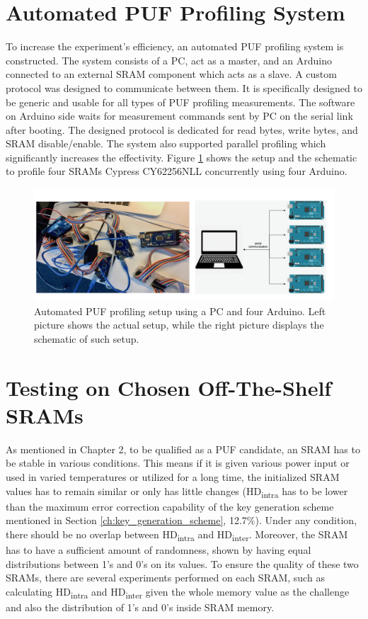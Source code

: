 \section{Automated PUF Profiling System}
To increase the experiment's efficiency, an automated PUF profiling system is constructed. The system consists of a PC, act as a master, and an Arduino connected to an external SRAM component which acts as a slave. A custom protocol was designed to communicate between them. It is specifically designed to be generic and usable for all types of PUF profiling measurements. The software on Arduino side waits for measurement commands sent by PC on the serial link after booting. The designed protocol is dedicated for read bytes, write bytes, and SRAM disable/enable. The system also supported parallel profiling which significantly increases the effectivity. Figure \ref{fig:puf_profiling} shows the setup and the schematic to profile four SRAMs Cypress CY62256NLL concurrently using four Arduino.

\begin{figure}[tph!]
    \centerline{\includegraphics[width={\textwidth}]{images/setup}}
    \caption{Automated PUF profiling setup using a PC and four Arduino. Left picture shows the actual setup, while the right picture displays the schematic of such setup.}
    \label{fig:puf_profiling}
\end{figure}

\section{Testing on Chosen Off-The-Shelf SRAMs}

As mentioned in Chapter 2, to be qualified as a PUF candidate, an SRAM has to be stable in various conditions. This means if it is given various power input or used in varied temperatures or utilized for a long time, the initialized SRAM values has to remain similar or only has little changes (HD\textsubscript{intra} has to be lower than the maximum error correction capability of the key generation scheme mentioned in Section \ref{ch:key_generation_scheme}, 12.7\%). Under any condition, there should be no overlap between HD\textsubscript{intra} and HD\textsubscript{inter}. Moreover, the SRAM has to have a sufficient amount of randomness, shown by having equal distributions between 1's and 0's on its values.  To ensure the quality of these two SRAMs, there are several experiments performed on each SRAM, such as calculating HD\textsubscript{intra} and HD\textsubscript{inter} given the whole memory value as the challenge and also the distribution of 1's and 0's inside SRAM memory.

